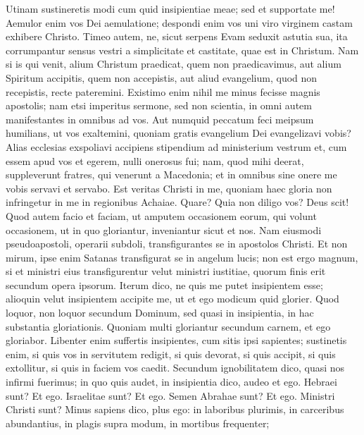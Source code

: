 \begin{biblechapter}  
\verse Utinam sustineretis modi cum quid insipientiae meae; sed et supportate me! 
\verse Aemulor enim vos Dei aemulatione; despondi enim vos uni viro virginem castam exhibere Christo. 
\verse Timeo autem, ne, sicut serpens Evam seduxit astutia sua, ita corrumpantur sensus vestri a simplicitate et castitate, quae est in Christum. 
\verse Nam si is qui venit, alium Christum praedicat, quem non praedicavimus, aut alium Spiritum accipitis, quem non accepistis, aut aliud evangelium, quod non recepistis, recte pateremini. 
\verse Existimo enim nihil me minus fecisse magnis apostolis; 
\verse nam etsi imperitus sermone, sed non scientia, in omni autem manifestantes in omnibus ad vos. 
\verse Aut numquid peccatum feci meipsum humilians, ut vos exaltemini, quoniam gratis evangelium Dei evangelizavi vobis? 
\verse Alias ecclesias exspoliavi accipiens stipendium ad ministerium vestrum 
\verse et, cum essem apud vos et egerem, nulli onerosus fui; nam, quod mihi deerat, suppleverunt fratres, qui venerunt a Macedonia; et in omnibus sine onere me vobis servavi et servabo. 
\verse Est veritas Christi in me, quoniam haec gloria non infringetur in me in regionibus Achaiae. 
\verse Quare? Quia non diligo vos? Deus scit! 
\verse Quod autem facio et faciam, ut amputem occasionem eorum, qui volunt occasionem, ut in quo gloriantur, inveniantur sicut et nos. 
\verse Nam eiusmodi pseudoapostoli, operarii subdoli, transfigurantes se in apostolos Christi. 
\verse Et non mirum, ipse enim Satanas transfigurat se in angelum lucis; 
\verse non est ergo magnum, si et ministri eius transfigurentur velut ministri iustitiae, quorum finis erit secundum opera ipsorum. 
\verse Iterum dico, ne quis me putet insipientem esse; alioquin velut insipientem accipite me, ut et ego modicum quid glorier. 
\verse Quod loquor, non loquor secundum Dominum, sed quasi in insipientia, in hac substantia gloriationis.  
\verse Quoniam multi gloriantur secundum carnem, et ego gloriabor. 
\verse Libenter enim suffertis insipientes, cum sitis ipsi sapientes; 
\verse sustinetis enim, si quis vos in servitutem redigit, si quis devorat, si quis accipit, si quis extollitur, si quis in faciem vos caedit. 
\verse Secundum ignobilitatem dico, quasi nos infirmi fuerimus; in quo quis audet, in insipientia dico, audeo et ego. 
\verse Hebraei sunt? Et ego. Israelitae sunt? Et ego. Semen Abrahae sunt? Et ego. 
\verse Ministri Christi sunt? Minus sapiens dico, plus ego: in laboribus plurimis, in carceribus abundantius, in plagis supra modum, in mortibus frequenter; 

\end{biblechapter}

